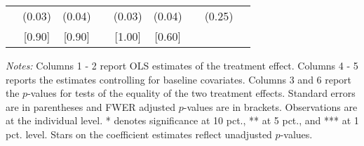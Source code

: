 \begin{table}[h]
{\begin{threeparttable}
\begin{tabular}{l*{8}{c}}
          &   (0.03)&   (0.04)&         &   (0.03)&   (0.04)&         &   (0.25)&         \\
          &   [0.90]&   [0.90]&         &   [1.00]&   [0.60]&         &         &         \\
\bottomrule \end{tabular} \begin{tablenotes}[flushleft] \footnotesize \item \emph{Notes:} Columns 1 - 2 report OLS estimates of the treatment effect. Columns 4 - 5 reports the estimates controlling for baseline covariates. Columns 3 and 6 report the \(p\)-values for tests of the equality of the two treatment effects. Standard errors are in parentheses and FWER adjusted \(p\)-values are in brackets. Observations are at the individual level. * denotes significance at 10 pct., ** at 5 pct., and *** at 1 pct. level. Stars on the coefficient estimates reflect unadjusted \(p\)-values. \end{tablenotes} \end{threeparttable} } \end{table}

